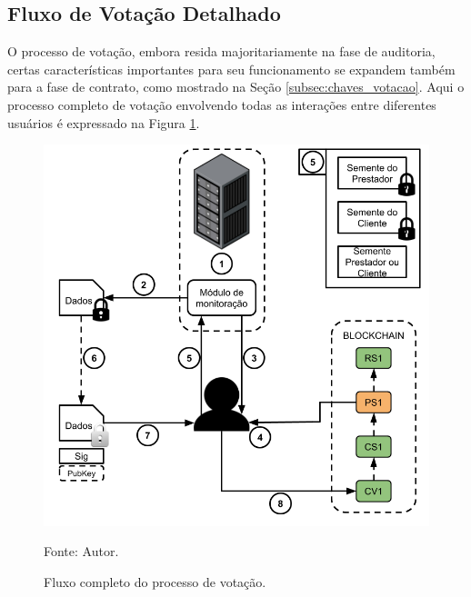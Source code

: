 

\subsection{Fluxo de Votação Detalhado}
\label{subsec:proposta:votacao_detalhada}

O processo de votação, embora resida majoritariamente na fase de auditoria, certas características importantes para seu funcionamento se expandem também para a fase de contrato, como mostrado na Seção \ref{subsec:chaves_votacao}. Aqui o processo completo de votação envolvendo todas as interações entre diferentes usuários é expressado na Figura \ref{fig:votacao_detalhada}.

\begin{figure}[ht!]
\caption{Fluxo completo do processo de votação.}
\centering
\includegraphics[width=1\textwidth]{imagens/votacao_detalhada.png}
\begin{center}
        Fonte: Autor.
\end{center}
\label{fig:votacao_detalhada}
\end{figure}

